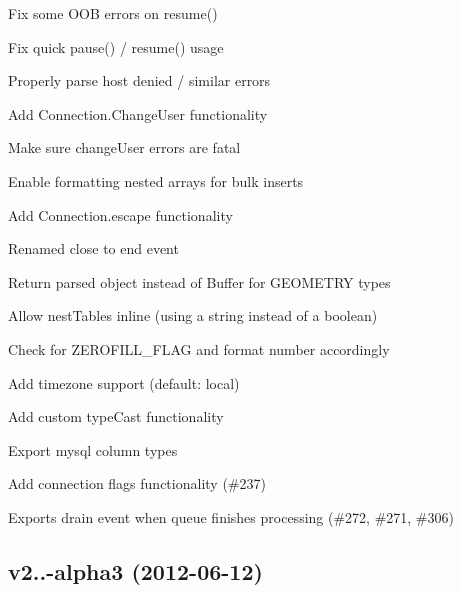\begin{DoxyItemize}
\item Fix some O\+O\+B errors on resume()
\item Fix quick pause() / resume() usage
\item Properly parse host denied / similar errors
\item Add Connection.\+Change\+User functionality
\item Make sure change\+User errors are fatal
\item Enable formatting nested arrays for bulk inserts
\item Add Connection.\+escape functionality
\item Renamed \textquotesingle{}close\textquotesingle{} to \textquotesingle{}end\textquotesingle{} event
\item Return parsed object instead of Buffer for G\+E\+O\+M\+E\+T\+R\+Y types
\item Allow nest\+Tables inline (using a string instead of a boolean)
\item Check for Z\+E\+R\+O\+F\+I\+L\+L\+\_\+\+F\+L\+A\+G and format number accordingly
\item Add timezone support (default\+: local)
\item Add custom type\+Cast functionality
\item Export mysql column types
\item Add connection flags functionality (\#237)
\item Exports drain event when queue finishes processing (\#272, \#271, \#306)
\end{DoxyItemize}

\subsection*{v2..-\/alpha3 (2012-\/06-\/12)}


